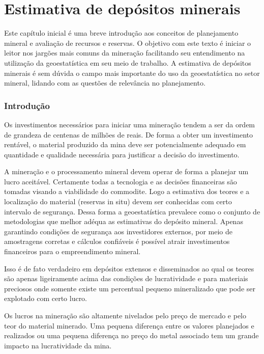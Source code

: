 
\chapter{Estimativa de depósitos minerais}



Este capítulo inicial é uma breve introdução aos conceitos de planejamento mineral e avaliação de recursos e reservas. O objetivo com este texto é iniciar o leitor nos jargões mais comuns da mineração facilitando seu entendimento na utilização da geoestatística em seu meio de trabalho. A estimativa de depósitos minerais é sem dúvida o campo mais importante do uso da geoestatística no setor mineral, lidando com as questões de relevância no planejamento.   

\subsection{Introdução}

Os investimentos necessários para iniciar uma mineração tendem a ser da ordem de grandeza de centenas de milhões de reais. De forma a obter um investimento rentável, o material produzido da mina deve ser potencialmente adequado em quantidade e qualidade necessária para justificar a decisão do investimento.

 A mineração e o processamento mineral devem operar de forma a planejar um lucro aceitável. Certamente todas a tecnologia e as decisões financeiras são tomadas visando a viabilidade do commodite. Logo a estimativa dos teores e a localização do material (reservas in situ) devem ser conhecidas com certo intervalo de segurança. Dessa forma a geoestatística prevalece como o conjunto de metodologias que melhor adéqua as estimativas do depósito mineral.  Apenas garantindo condições de segurança aos investidores externos, por meio de amostragens corretas e cálculos confiáveis é possível atrair investimentos financeiros para o empreendimento mineral. 
 
Isso é de fato verdadeiro em depósitos extensos e disseminados ao qual os teores são apenas ligeiramente acima das condições de lucratividade e para materiais preciosos onde somente existe um percentual pequeno mineralizado que pode ser explotado com certo lucro. 
 
 Os lucros na mineração são altamente nivelados pelo preço de mercado e pelo teor do material minerado. Uma pequena diferença entre os valores planejados e realizados ou uma pequena diferença no preço do metal associado tem um grande impacto na lucratividade da mina. 
 
